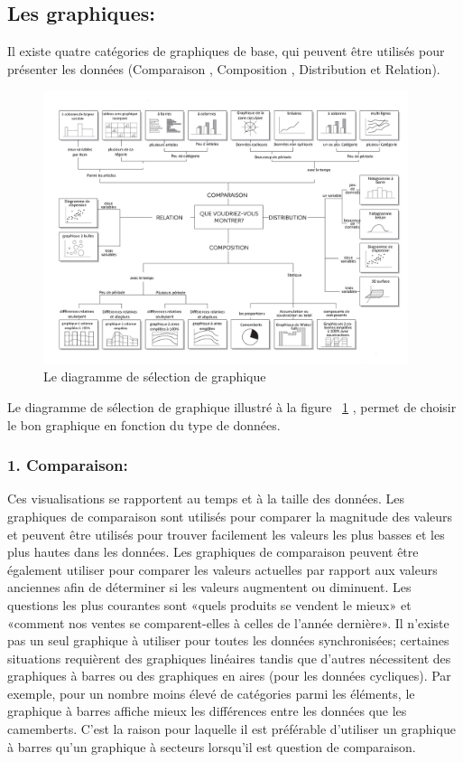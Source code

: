 \documentclass[french, a4paper, 12pt]{report}
\begin{document}
\subsection{Les graphiques:}
Il existe quatre catégories de graphiques de base, qui peuvent être utilisés pour présenter les données (Comparaison , Composition , Distribution et Relation).
\begin{figure}[!ht]
    \centering
    \includegraphics[height=8cm]{images/diagramme-de-charts.jpg}
    \caption{Le diagramme de sélection de graphique \footnotemark}
    \label{fig:2.1}
\end{figure}
 Le diagramme de sélection de graphique illustré à la figure ~\ref{fig:2.1}
, permet de choisir le bon graphique en fonction du type de données.
\subsubsection{1. Comparaison: }
Ces visualisations se rapportent au temps et à la taille des données. Les graphiques de comparaison sont utilisés pour comparer la magnitude des valeurs et peuvent être utilisés pour trouver facilement les valeurs les plus basses et les plus hautes dans les données. Les graphiques de comparaison peuvent être également utiliser pour comparer les valeurs actuelles par rapport aux valeurs anciennes afin de déterminer si les valeurs augmentent ou diminuent. Les questions les plus courantes sont «quels produits se vendent le mieux» et «comment nos ventes se comparent-elles à celles de l'année dernière».
Il n’existe pas un seul graphique à utiliser pour toutes les données synchronisées; certaines situations requièrent des graphiques linéaires tandis que d'autres nécessitent des graphiques à barres ou des graphiques en aires (pour les données cycliques).
Par exemple, pour un nombre moins élevé de catégories parmi les éléments, le  graphique à barres affiche mieux les différences entre les données que les camemberts. C’est la raison pour laquelle il est préférable d’utiliser un graphique à barres qu’un graphique à secteurs lorsqu'il est question de comparaison.
\end{document}
